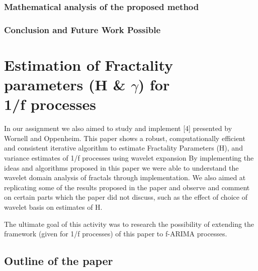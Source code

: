 \documentclass[a4paper]{article}
\begin{document}
\subsubsection{Mathematical analysis of the proposed method}
\subsubsection{Conclusion and Future Work Possible}
\section{Estimation of Fractality parameters (H \& $\gamma$) for \\1/f processes}
In our assignment we also aimed to study and implement [4] presented by Wornell and Oppenheim. This paper shows a robust, computationally efficient and consistent iterative algorithm to estimate Fractality Parameters (H), ​and variance estimates of 1/f processes using wavelet expansion
By implementing the ideas and algorithms proposed in this paper we were able to understand the wavelet domain analysis of fractals through implementation. We also aimed at replicating some of the results proposed in the paper and observe and comment on certain parts which the paper did not discuss, such as the effect of choice of wavelet basis on estimates of H.

The ultimate goal of this activity was to research the possibility of extending the framework (given for 1/f processes) of this paper to f-ARIMA processes.

\subsection{Outline of the paper}
\end{document}
